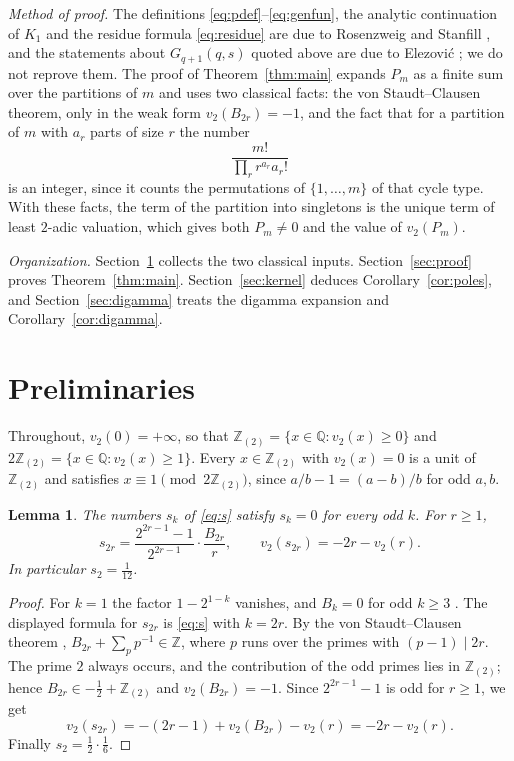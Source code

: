 \documentclass[11pt]{amsart}
\newtheorem{lemma}[theorem]{Lemma}
\theoremstyle{definition}
\theoremstyle{remark}
\numberwithin{equation}{section}
\newcommand{\Z}{\mathbb{Z}}
\newcommand{\Q}{\mathbb{Q}}
\newcommand{\Zt}{\Z_{(2)}}
\begin{document}
\emph{Method of proof.} The definitions \eqref{eq:pdef}--\eqref{eq:genfun}, the analytic continuation of $K_1$ and the residue formula \eqref{eq:residue} are due to Rosenzweig and Stanfill \cite{RS}, and the statements about $G_{q+1}(q,s)$ quoted above are due to Elezovi\'c \cite{E}; we do not reprove them. The proof of Theorem~\ref{thm:main} expands $P_m$ as a finite sum over the partitions of $m$ and uses two classical facts: the von Staudt--Clausen theorem, only in the weak form $v_2(B_{2r})=-1$, and the fact that for a partition of $m$ with $a_r$ parts of size $r$ the number
\[
  \frac{m!}{\prod_r r^{a_r}a_r!}
\]
is an integer, since it counts the permutations of $\{1,\dots,m\}$ of that cycle type. With these facts, the term of the partition into singletons is the unique term of least $2$-adic valuation, which gives both $P_m\ne0$ and the value of $v_2(P_m)$.

\emph{Organization.} Section~\ref{sec:prelim} collects the two classical inputs. Section~\ref{sec:proof} proves Theorem~\ref{thm:main}. Section~\ref{sec:kernel} deduces Corollary~\ref{cor:poles}, and Section~\ref{sec:digamma} treats the digamma expansion and Corollary~\ref{cor:digamma}.

\section{Preliminaries}\label{sec:prelim}

Throughout, $v_2(0)=+\infty$, so that $\Zt=\{x\in\Q:v_2(x)\ge0\}$ and $2\Zt=\{x\in\Q:v_2(x)\ge1\}$. Every $x\in\Zt$ with $v_2(x)=0$ is a unit of $\Zt$ and satisfies $x\equiv1\pmod{2\Zt}$, since $a/b-1=(a-b)/b$ for odd $a,b$.

\begin{lemma}\label{lem:s}
The numbers $s_k$ of \eqref{eq:s} satisfy $s_k=0$ for every odd $k$. For $r\ge1$,
\[
  s_{2r}=\frac{2^{2r-1}-1}{2^{2r-1}}\cdot\frac{B_{2r}}{r},
  \qquad
  v_2(s_{2r})=-2r-v_2(r).
\]
In particular $s_2=\frac1{12}$.
\end{lemma}

\begin{proof}
For $k=1$ the factor $1-2^{1-k}$ vanishes, and $B_k=0$ for odd $k\ge3$ \cite[Section~24.2(i)]{DLMF}. The displayed formula for $s_{2r}$ is \eqref{eq:s} with $k=2r$. By the von Staudt--Clausen theorem \cite[24.10.1]{DLMF}, $B_{2r}+\sum_p p^{-1}\in\Z$, where $p$ runs over the primes with $(p-1)\mid 2r$. The prime $2$ always occurs, and the contribution of the odd primes lies in $\Zt$; hence $B_{2r}\in-\frac12+\Zt$ and $v_2(B_{2r})=-1$. Since $2^{2r-1}-1$ is odd for $r\ge1$, we get
\[
  v_2(s_{2r})=-(2r-1)+v_2(B_{2r})-v_2(r)=-2r-v_2(r).
\]
Finally $s_2=\frac12\cdot\frac16$.
\end{proof}
\end{document}

